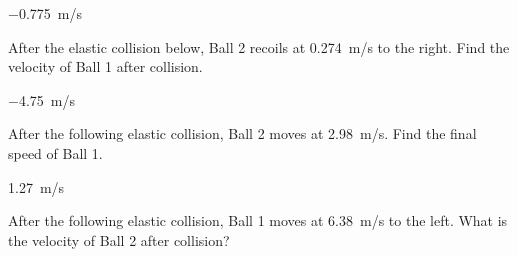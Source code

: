 \documentclass[]{exam}
\begin{document}
\begin{questions}
\begin{solution}
    \SI{-0.775}{m/s}
\end{solution}

\question
After the elastic collision below, Ball 2 recoils at \SI{0.274}{m/s} to the right. Find the velocity of Ball 1 after collision. 

\begin{center}
\end{center}

\begin{solution}
    \SI{-4.75}{m/s}
\end{solution}

\question
After the following elastic collision, Ball 2 moves at \SI{2.98}{m/s}. Find the final speed of Ball 1.


\begin{center}
\end{center}


\begin{solution}
    \SI{1.27}{m/s}
\end{solution}

\question
After the following elastic collision, Ball 1 moves at \SI{6.38}{m/s} to the left. What is the velocity of Ball 2 after collision? %




\end{questions}
\end{document}
